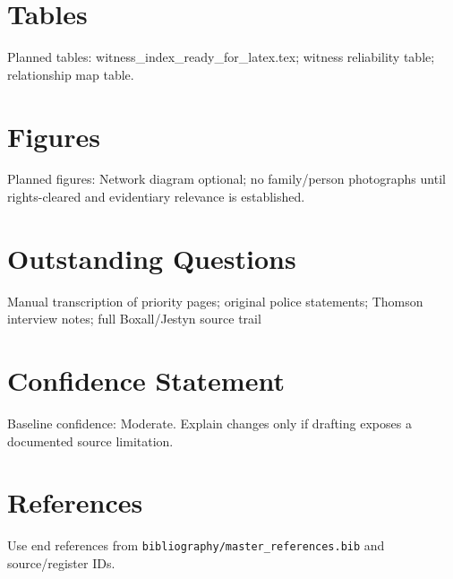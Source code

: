 \section{Tables}
Planned tables: witness_index_ready_for_latex.tex; witness reliability table; relationship map table.

\section{Figures}
Planned figures: Network diagram optional; no family/person photographs until rights-cleared and evidentiary relevance is established.

\section{Outstanding Questions}
Manual transcription of priority pages; original police statements; Thomson interview notes; full Boxall/Jestyn source trail

\section{Confidence Statement}
Baseline confidence: Moderate. Explain changes only if drafting exposes a documented source limitation.

\section{References}
Use end references from \texttt{bibliography/master_references.bib} and source/register IDs.
